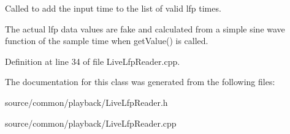 Called to add the input time to the list of valid lfp times. 

The actual lfp data values are fake and calculated from a simple sine wave function of the sample time when get\-Value() is called. 

Definition at line 34 of file Live\-Lfp\-Reader.\-cpp.



The documentation for this class was generated from the following files\-:\begin{DoxyCompactItemize}
\item 
source/common/playback/Live\-Lfp\-Reader.\-h\item 
source/common/playback/Live\-Lfp\-Reader.\-cpp\end{DoxyCompactItemize}
